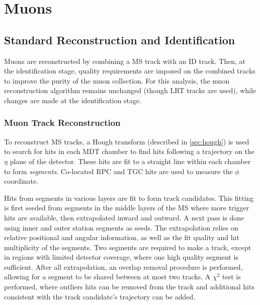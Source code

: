 \section{Muons}
\label{sec:muonreco}
\subsection{Standard Reconstruction and Identification}

Muons are reconstructed by combining a \ac{MS} track with an \ac{ID} track. Then, at the identification stage, quality requirements are imposed on the combined tracks to improve the purity of the muon collection. For this analysis, the muon reconstruction algorithm remains unchanged (though \ac{LRT} tracks are used), while changes are made at the identification stage. \cite{muon-reco}

\subsubsection{Muon Track Reconstruction}
To reconstruct \ac{MS} tracks, a Hough transform (described in \autoref{sec:hough}) is used to search for hits in each \ac{MDT} chamber to find hits following a trajectory on the $\eta$ plane of the detector. These hits are fit to a straight line within each chamber to form \emph{segments}. Co-located \ac{RPC} and \ac{TGC} hits are used to measure the $\phi$ coordinate. 

Hits from segments in various layers are fit to form track candidates. This fitting is first seeded from segments in the middle layers of the \ac{MS} where more trigger hits are available, then extrapolated inward and outward. A next pass is done using inner and outer station segments as seeds. The extrapolation relies on relative positional and angular information, as well as the fit quality and hit multiplicity of the segments. Two segments are required to make a track, except in regions with limited detector coverage, where one high quality segment is sufficient. After all extrapolation, an overlap removal procedure is performed, allowing for a segment to be shared between at most two tracks. A $\chi^{2}$ test is performed, where outliers hits can be removed from the track and additional hits consistent with the track candidate's trajectory can be added.



